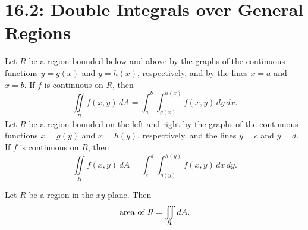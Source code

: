 \documentclass[mathNotesPreamble]{subfiles}
\begin{document}
\section{16.2: Double Integrals over General Regions}

  \begin{thmBox*}
    Let $R$ be a region bounded below and above by the graphs of the continuous functions $y=g(x)$ and $y=h(x)$, respectively, and by the lines $x=a$ and $x=b$. If $f$ is continuous on $R$, then
      \[\iint\limits_R f(x,y)\,dA=\int_a^b \int_{g(x)}^{h(x)} f(x,y)\,dy\,dx.\]
    Let $R$ be a region bounded on the left and right by the graphs of the continuous functions $x=g(y)$ and $x=h(y)$, respectively, and the lines $y=c$ and $y=d$. If $f$ is continuous on $R$, then
      \[\iint\limits_R f(x,y)\,dA=\int_c^d\int_{g(y)}^{h(y)}f(x,y)\,dx\,dy.\]
  \end{thmBox*}

  \begin{thmBox*}
    Let $R$ be a region in the $xy$-plane. Then
      \[\textnormal{area of } R=\iint\limits_R dA.\]
  \end{thmBox*}

  \pagebreak
  
\end{document}
